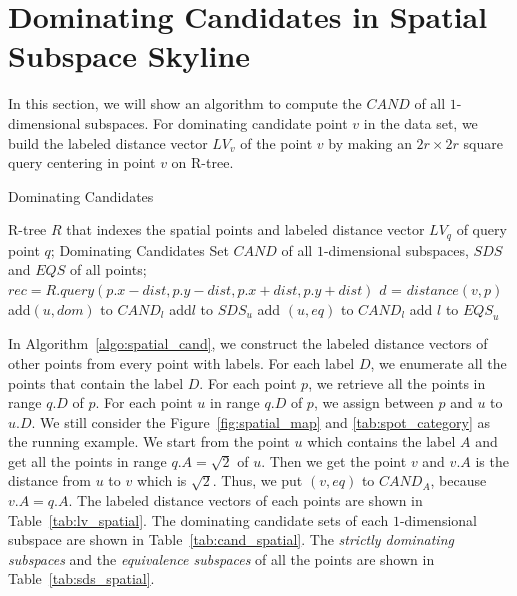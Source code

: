 \section{Dominating Candidates in Spatial Subspace Skyline}

In this section, we will show an algorithm to compute the $\mathit{CAND}$ of all $1$-dimensional subspaces. For dominating candidate point $v$ in the data set, we build the labeled distance vector $LV_v$ of the point $v$ by making an $2r \times 2r$ square query centering in point $v$ on R-tree.

\begin{algorithm}[H]
  \caption{Dominating Candidates}
  \label{algo:spatial_cand}
  \begin{algorithmic}[1]
  \show\LOOP
    \REQUIRE R-tree $R$ that indexes the spatial points and labeled distance vector $LV_q$ of query point $q$;
    \ENSURE Dominating Candidates Set $\mathit{CAND}$ of all $1$-dimensional subspaces, $\mathit{SDS}$ and $\mathit{EQS}$ of all points;
            \STATE $rec = R.query(p.x-dist, p.y-dist, p.x+dist, p.y+dist)$
                \STATE $d$ = $distance(v, p)$
                    \STATE add$(u, dom)$ to $\mathit{CAND}_l$
                    \STATE add$l$ to $\mathit{SDS}_u$
                \ENDIF
                    \STATE add $(u, eq)$ to $\mathit{CAND}_l$
                    \STATE add $l$ to $\mathit{EQS}_u$
                \ENDIF
            \ENDFOR
            
        \ENDFOR
    \ENDFOR
  \end{algorithmic}
\end{algorithm}

In Algorithm~\ref{algo:spatial_cand}, we construct the labeled distance vectors of other points from every point with labels. For each label $D$, we enumerate all the points that contain the label $D$. For each point $p$, we retrieve all the points in range $q.D$ of $p$. For each point $u$ in range $q.D$ of $p$, we assign between $p$ and $u$ to $u.D$. 
We still consider the Figure~\ref{fig:spatial_map} and \ref{tab:spot_category} as the running example. We start from the point $u$ which contains the label $A$ and get all the points in range $q.A = \sqrt{2}$ of $u$. Then we get the point $v$ and $v.A$ is the distance from $u$ to $v$ which is $\sqrt{2}$. Thus, we put $(v, eq)$ to $\mathit{CAND}_A$, because $v.A=q.A$. The labeled distance vectors of each points are shown in Table~\ref{tab:lv_spatial}. The dominating candidate sets of each $1$-dimensional subspace are shown in Table~\ref{tab:cand_spatial}. The \emph{strictly dominating subspaces} and the \emph{equivalence subspaces} of all the points are shown in Table~\ref{tab:sds_spatial}.

